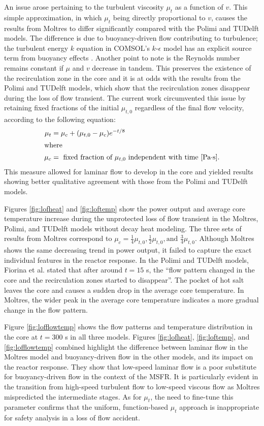 An issue arose pertaining to the turbulent viscosity $\mu_t$ as a function of
$v$. This simple approximation, in which $\mu_t$ being directly proportional
to $v$, causes the results from Moltres to differ significantly compared with
the Polimi and TUDelft models. The difference is due to buoyancy-driven flow
contributing to turbulence; the turbulent energy $k$ equation in COMSOL's
$k$-$\epsilon$ model has an explicit source term from buoyancy effects
\cite{comsol_ab_comsol_2018}. Another point to note is the
Reynolds number remains constant if $\mu$ and $v$ decrease in tandem. This
preserves the existence of the recirculation zone in the core and it is at
odds with the results from the Polimi and TUDelft models, which show that the
recirculation zones disappear during the loss of flow transient. The current
work circumvented this issue by retaining fixed fractions of the initial
$\mu_{t,0}$ regardless of the final flow velocity, according to
the following equation:
%
\begin{align}
    \mu_t &= \mu_c + (\mu_{t,0} - \mu_c) e^{-t/8} \label{lofmu} \\
    \intertext{where}
    \mu_c &= \text{ fixed fraction of $\mu_{t,0}$ independent with time
    [Pa$\cdot$s].} \nonumber
\end{align}
%
This measure allowed for laminar flow to develop in the core and yielded
results showing better qualitative agreement with those from the Polimi and
TUDelft models.

Figures \ref{fig:lofheat} and \ref{fig:loftemp} show the power output and
average core temperature increase during the unprotected loss of flow
transient in the Moltres, Polimi, and TUDelft models without decay heat
modeling. The three sets of results from Moltres correspond to $\mu_c =
\frac{1}{4} \mu_{t,0}, \frac{1}{2} \mu_{t,0}, \text{and } \frac{3}{4}
\mu_{t,0}$.
Although Moltres shows the same decreasing trend in power output, it failed to
capture the exact individual features in the reactor response. In the Polimi 
and TUDelft models, Fiorina et al. \cite{fiorina_modelling_2014}
stated that after around $t=15$ s, the ``flow pattern changed in the core and
the recirculation zones started to disappear''. The pocket of hot salt leaves
the core and causes a sudden drop in the average core temperature. In Moltres,
the wider peak in the average core temperature
indicates a more gradual change in the flow pattern.

Figure \ref{fig:lofflowtemp} shows the flow patterns and temperature
distribution in the core at $t=300$ s in all three models. Figures
\ref{fig:lofheat}, \ref{fig:loftemp}, and \ref{fig:lofflowtemp} combined
highlight the difference between laminar flow in the Moltres model and
buoyancy-driven flow in the other models, and its impact on the reactor
response. They show that low-speed laminar flow is a poor substitute for
buoyancy-driven flow in the context of the MSFR. It is particularly evident
in the transition from high-speed turbulent flow to low-speed viscous
flow as Moltres mispredicted the intermediate stages. As for $\mu_t$, the need
to fine-tune this parameter confirms that the uniform, function-based $\mu_t$
approach is inappropriate for safety analysis in a loss of flow accident.

